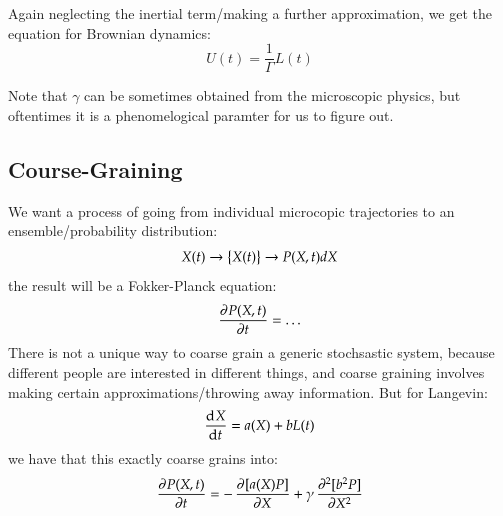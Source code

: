Again neglecting the inertial term/making a further approximation, we get the equation for Brownian dynamics:
\begin{equation}
    U(t) = \frac{1}{\Gamma}L(t)
\end{equation}

Note that $\gamma$ can be sometimes obtained from the microscopic physics, but oftentimes it is a phenomelogical paramter for us to figure out.


\subsection{Course-Graining}
We want a process of going from individual microcopic trajectories to an ensemble/probability distribution:
\begin{equation}
    X(t) \to \set{X(t)} \to P(X, t)dX
\end{equation}
the result will be a Fokker-Planck equation:
\begin{equation}
    \dpd{P(X, t)}{t} = \ldots
\end{equation}
There is not a unique way to coarse grain a generic stochsastic system, because different people are interested in different things, and coarse graining involves making certain approximations/throwing away information. But for Langevin:
\begin{equation}
    \dod{X}{t} = a(X) + bL(t)
\end{equation}
we have that this exactly coarse grains into:
\begin{equation}
    \dpd{P(X, t)}{t} = -\dpd{[a(X)P]}{X} + \gamma\dpd[2]{[b^2P]}{X}
\end{equation}

